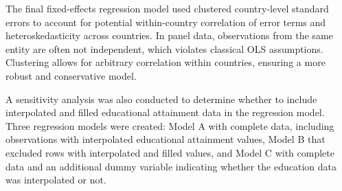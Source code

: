 The final fixed-effects regression model used clustered country-level standard errors to 
account for potential within-country correlation of error terms and heteroskedasticity across 
countries. In panel data, observations from the same entity are often not independent, which 
violates classical OLS assumptions. Clustering allows for arbitrary correlation within 
countries, ensuring a more robust and conservative model.

A sensitivity analysis was also conducted to determine whether to include interpolated and filled educational 
attainment data in the regression model. Three regression models were created: Model A with 
complete data, including observations with interpolated educational attainment values, Model B 
that excluded rows with interpolated and filled values, and Model C with complete data and an additional 
dummy variable indicating whether the education data was interpolated or not.